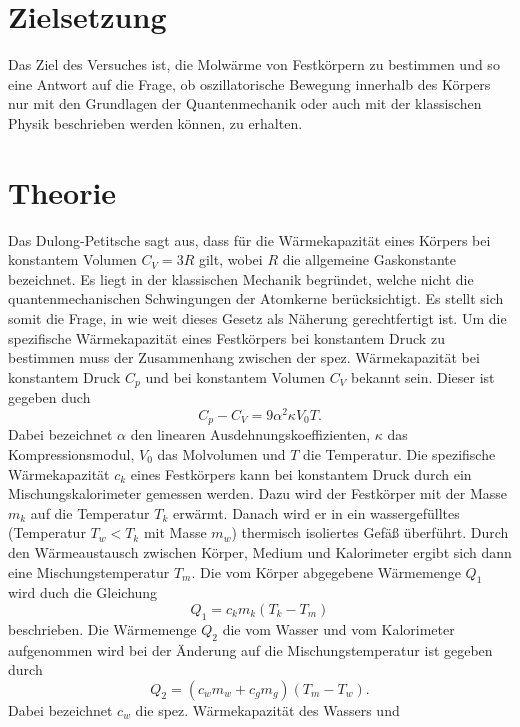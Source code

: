 \section{Zielsetzung}
Das Ziel des Versuches ist, die Molwärme von Festkörpern zu bestimmen und
so eine Antwort auf die Frage, ob oszillatorische Bewegung innerhalb des Körpers
nur mit den Grundlagen der Quantenmechanik oder auch mit der klassischen Physik
beschrieben werden können, zu erhalten.
\section{Theorie}
\label{sec:Theorie}
Das Dulong-Petitsche sagt aus, dass für die Wärmekapazität eines Körpers bei konstantem Volumen $C_V = 3R$ gilt, wobei $R$ die allgemeine Gaskonstante bezeichnet. Es liegt in der klassischen Mechanik begründet, welche nicht die quantenmechanischen Schwingungen der Atomkerne berücksichtigt. Es stellt sich somit die Frage, in wie weit dieses Gesetz als Näherung gerechtfertigt ist.
Um die spezifische Wärmekapazität eines Festkörpers bei konstantem Druck zu
bestimmen muss der Zusammenhang zwischen der spez. Wärmekapazität bei
konstantem Druck $C_p$ und bei konstantem Volumen $C_V$ bekannt sein. Dieser ist
gegeben duch
\begin{equation}
  C_p - C_V = 9 \alpha^2 \kappa V_0 T.
  \label{eqn:cp-cv}
\end{equation}
Dabei bezeichnet $\alpha$ den linearen Ausdehnungskoeffizienten,
$\kappa$ das Kompressionsmodul, $V_0$ das Molvolumen und $T$ die Temperatur.
Die spezifische Wärmekapazität $c_k $ eines Festkörpers kann bei konstantem
Druck durch ein Mischungskalorimeter gemessen werden. Dazu wird der Festkörper
mit der Masse $m_k$ auf die Temperatur $T_k$ erwärmt. Danach wird er in ein wassergefülltes (Temperatur $ T_w < T_k $ mit Masse $m_w$) thermisch isoliertes Gefäß überführt.
 Durch den Wärmeaustausch zwischen Körper, Medium und Kalorimeter ergibt sich dann
eine Mischungstemperatur $T_m$.  Die vom Körper abgegebene Wärmemenge $Q_1$
wird duch die Gleichung
\begin{equation}
  Q_1 = c_k m_k (T_k - T_m)
  \label{eqn:q1}
\end{equation}
beschrieben. Die Wärmemenge $Q_2$ die vom Wasser und vom Kalorimeter aufgenommen wird
bei der Änderung auf die Mischungstemperatur ist gegeben durch
\begin{equation}
  Q_2 = (c_w m_w + c_g m_g)(T_m - T_w).
  \label{eqn:q2}
\end{equation}
Dabei bezeichnet $c_w$ die spez. Wärmekapazität des Wassers und
